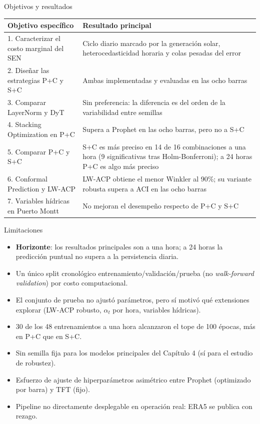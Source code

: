 \documentclass[aspectratio=169]{beamer}
\begin{document}
\begin{frame}{Objetivos y resultados}
    \begin{table}
        \centering
        \scriptsize
        \begin{tabular}{p{4.2cm}p{9.2cm}}
            \toprule
            Objetivo específico & Resultado principal \\
            \midrule
            1. Caracterizar el costo marginal del SEN & Ciclo diario marcado por la generación solar, heterocedasticidad horaria y colas pesadas del error \\
            2. Diseñar las estrategias P+C y S+C & Ambas implementadas y evaluadas en las ocho barras \\
            3. Comparar LayerNorm y DyT & Sin preferencia: la diferencia es del orden de la variabilidad entre semillas \\
            4. Stacking Optimization en P+C & Supera a Prophet en las ocho barras, pero no a S+C \\
            5. Comparar P+C y S+C & S+C es más preciso en 14 de 16 combinaciones a una hora (9 significativas tras Holm-Bonferroni); a 24 horas P+C es algo más preciso \\
            6. Conformal Prediction y LW-ACP & LW-ACP obtiene el menor Winkler al 90\%; su variante robusta supera a ACI en las ocho barras \\
            7. Variables hídricas en Puerto Montt & No mejoran el desempeño respecto de P+C y S+C \\
            \bottomrule
        \end{tabular}
    \end{table}
\end{frame}

\begin{frame}{Limitaciones}
    \begin{itemize}
        \item \textbf{Horizonte}: los resultados principales son a una hora; a 24 horas la predicción puntual no supera a la persistencia diaria.
        \item Un único split cronológico entrenamiento/validación/prueba (no \textit{walk-forward validation}) por costo computacional.
        \item El conjunto de prueba no ajustó parámetros, pero sí motivó qué extensiones explorar (LW-ACP robusto, $\alpha_t$ por hora, variables hídricas).
        \item 30 de los 48 entrenamientos a una hora alcanzaron el tope de 100 épocas, más en P+C que en S+C.
        \item Sin semilla fija para los modelos principales del Capítulo 4 (sí para el estudio de robustez).
        \item Esfuerzo de ajuste de hiperparámetros asimétrico entre Prophet (optimizado por barra) y TFT (fijo).
        \item Pipeline no directamente desplegable en operación real: ERA5 se publica con rezago.
    \end{itemize}
\end{frame}
\end{document}
